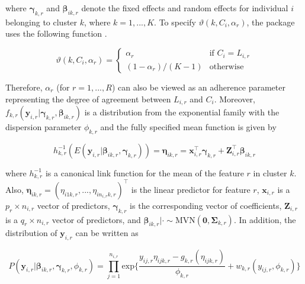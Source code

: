 where $\boldsymbol{\gamma}_{k,r}$ and $\boldsymbol{\beta}_{ik,r}$ denote the fixed effects and random effects for individual $i$ belonging to cluster $k$, where $k=1,...,K$. To specify $\vartheta(k,C_i,\alpha_r)$, the package uses the following function \citep{Lock2013}. 

\begin{equation}

  \vartheta(k,C_i,\alpha_r)  =

    \begin{cases}

      \alpha_r & \text{if } C_i = L_{i,r}\\

      (1- \alpha_r)/(K-1) & \text{otherwise}

    \end{cases}       

\end{equation}

Therefore, $\alpha_r$ (for $r = 1,...,R$) can also be viewed as an adherence parameter representing the degree of agreement between $L_{i,r}$ and $C_i$. Moreover, $ f_{k,r}(\boldsymbol{y}_{i,r}|\boldsymbol{\gamma}_{k,r}, \boldsymbol{\beta}_{ik,r})$ is a distribution from the exponential family with the dispersion parameter $\phi_{k,r}$ and the fully specified mean function is given by 

\begin{equation}

h^{-1}_{k,r}(E(\boldsymbol{y}_{i,r}|\boldsymbol{\beta}_{ik,r},\boldsymbol{\gamma}_{k,r})) = \boldsymbol{\eta}_{ik,r} = \boldsymbol{x}_{i,r}^\top\boldsymbol{\gamma}_{k,r} +  \boldsymbol{Z}_{i,r}^\top\boldsymbol{\beta}_{ik,r}

\end{equation}

where $h_{k,r}^{-1}$ is a canonical link function for the mean of the feature $r$ in cluster $k$. Also, $\boldsymbol{\eta}_{ik,r} = (\eta_{i1k,r},...,\eta_{in_{i,r}k,r})^\top$ is the linear predictor for feature $r$, $\boldsymbol{x}_{i,r}$ is a $p_r\times n_{i,r}$ vector of predictors, $\boldsymbol{\gamma}_{k,r}$ is the corresponding vector of coefficients, $\boldsymbol{Z}_{i,r}$ is a $q_r\times n_{i,r}$ vector of predictors, and $\boldsymbol{\beta}_{ik,r}|\cdot \sim \text{MVN}(\boldsymbol{0},\boldsymbol{\Sigma}_{k,r})$. In addition, the distribution of $\boldsymbol{y}_{i,r}$ can be written as

\begin{equation}

P(\boldsymbol{y}_{i,r}|\boldsymbol{\beta}_{ik,r},\boldsymbol{\gamma}_{k,r}, \phi_{k,r}) = \prod_{j=1}^{n_{i,r}} \text{exp}\bigg\{ \frac{y_{ij,r}\eta_{ijk,r} - g_{k,r}(\eta_{ijk,r})}{\phi_{k,r}} + w_{k,r}(y_{ij,r},\phi_{k,r}) \bigg\} 

\end{equation}

